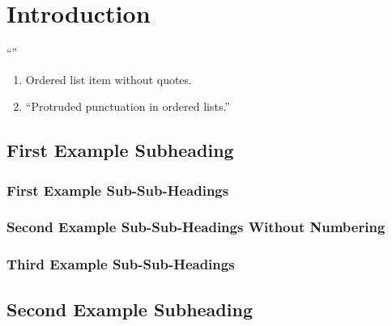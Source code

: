 \section{Introduction}

\enquote{\lipsum[1-1]}

\begin{enumerate}
    \item Ordered list item without quotes.
    \item \enquote{Protruded punctuation in ordered lists.}
\end{enumerate}

\subsection{First Example Subheading}

\lipsum[1-4]

\subsubsection{First Example Sub-Sub-Headings}

\lipsum[1-1]

\subsubsection*{Second Example Sub-Sub-Headings Without Numbering}

\lipsum[1-1]

\subsubsection{Third Example Sub-Sub-Headings}

\lipsum[1-1]

\subsection{Second Example Subheading}

\lipsum[1-1]
